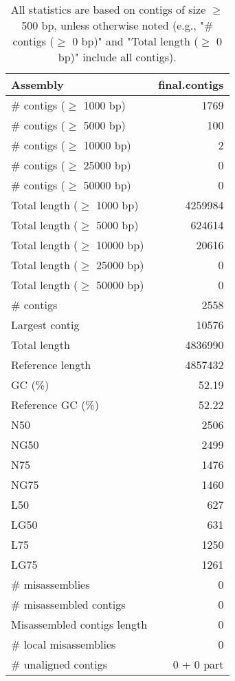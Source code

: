 \documentclass[12pt,a4paper]{article}
\begin{document}
\begin{table}[ht]
\begin{center}
\caption{All statistics are based on contigs of size $\geq$ 500 bp, unless otherwise noted (e.g., "\# contigs ($\geq$ 0 bp)" and "Total length ($\geq$ 0 bp)" include all contigs).}
\begin{tabular}{|l*{1}{|r}|}
\hline
Assembly & final.contigs \\ \hline
\# contigs ($\geq$ 1000 bp) & 1769 \\ \hline
\# contigs ($\geq$ 5000 bp) & 100 \\ \hline
\# contigs ($\geq$ 10000 bp) & 2 \\ \hline
\# contigs ($\geq$ 25000 bp) & 0 \\ \hline
\# contigs ($\geq$ 50000 bp) & 0 \\ \hline
Total length ($\geq$ 1000 bp) & 4259984 \\ \hline
Total length ($\geq$ 5000 bp) & 624614 \\ \hline
Total length ($\geq$ 10000 bp) & 20616 \\ \hline
Total length ($\geq$ 25000 bp) & 0 \\ \hline
Total length ($\geq$ 50000 bp) & 0 \\ \hline
\# contigs & 2558 \\ \hline
Largest contig & 10576 \\ \hline
Total length & 4836990 \\ \hline
Reference length & 4857432 \\ \hline
GC (\%) & 52.19 \\ \hline
Reference GC (\%) & 52.22 \\ \hline
N50 & 2506 \\ \hline
NG50 & 2499 \\ \hline
N75 & 1476 \\ \hline
NG75 & 1460 \\ \hline
L50 & 627 \\ \hline
LG50 & 631 \\ \hline
L75 & 1250 \\ \hline
LG75 & 1261 \\ \hline
\# misassemblies & 0 \\ \hline
\# misassembled contigs & 0 \\ \hline
Misassembled contigs length & 0 \\ \hline
\# local misassemblies & 0 \\ \hline
\# unaligned contigs & 0 + 0 part \\ \hline

\end{tabular}
\end{center}
\end{table}
\end{document}
